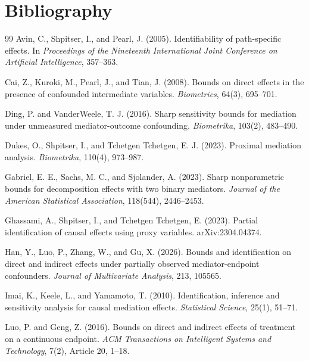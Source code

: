 \documentclass[11pt]{article}
\theoremstyle{definition}
\theoremstyle{plain}
\theoremstyle{remark}
\begin{document}
\section*{Bibliography}
\begin{thebibliography}{99}
Avin, C., Shpitser, I., and Pearl, J. (2005).
Identifiability of path-specific effects.
In \emph{Proceedings of the Nineteenth International Joint Conference on Artificial Intelligence}, 357--363.

Cai, Z., Kuroki, M., Pearl, J., and Tian, J. (2008).
Bounds on direct effects in the presence of confounded intermediate variables.
\emph{Biometrics}, 64(3), 695--701.

Ding, P. and VanderWeele, T. J. (2016).
Sharp sensitivity bounds for mediation under unmeasured mediator-outcome confounding.
\emph{Biometrika}, 103(2), 483--490.

Dukes, O., Shpitser, I., and Tchetgen Tchetgen, E. J. (2023).
Proximal mediation analysis.
\emph{Biometrika}, 110(4), 973--987.

Gabriel, E. E., Sachs, M. C., and Sjolander, A. (2023).
Sharp nonparametric bounds for decomposition effects with two binary mediators.
\emph{Journal of the American Statistical Association}, 118(544), 2446--2453.

Ghassami, A., Shpitser, I., and Tchetgen Tchetgen, E. (2023).
Partial identification of causal effects using proxy variables.
arXiv:2304.04374.

Han, Y., Luo, P., Zhang, W., and Gu, X. (2026).
Bounds and identification on direct and indirect effects under partially observed mediator-endpoint confounders.
\emph{Journal of Multivariate Analysis}, 213, 105565.

Imai, K., Keele, L., and Yamamoto, T. (2010).
Identification, inference and sensitivity analysis for causal mediation effects.
\emph{Statistical Science}, 25(1), 51--71.

Luo, P. and Geng, Z. (2016).
Bounds on direct and indirect effects of treatment on a continuous endpoint.
\emph{ACM Transactions on Intelligent Systems and Technology}, 7(2), Article 20, 1--18.


\end{thebibliography}
\end{document}
